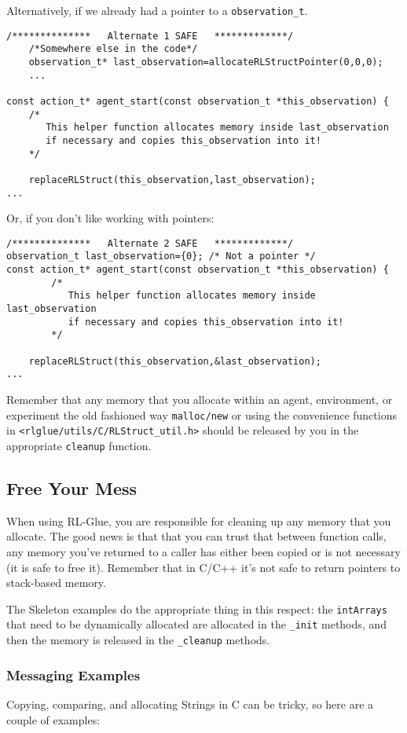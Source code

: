 \documentclass[11pt]{article}
\begin{document}
Alternatively, if we already had a pointer to a \texttt{observation\_t}.
\begin{verbatim}
/**************   Alternate 1 SAFE   *************/
    /*Somewhere else in the code*/
    observation_t* last_observation=allocateRLStructPointer(0,0,0);
    ...

const action_t* agent_start(const observation_t *this_observation) {
    /*
       This helper function allocates memory inside last_observation
       if necessary and copies this_observation into it!
    */

    replaceRLStruct(this_observation,last_observation);
...
\end{verbatim}

Or, if you don't like working with pointers:
\begin{verbatim}
/**************   Alternate 2 SAFE   *************/
observation_t last_observation={0}; /* Not a pointer */
const action_t* agent_start(const observation_t *this_observation) {
        /*
           This helper function allocates memory inside last_observation
           if necessary and copies this_observation into it!
        */
    
    replaceRLStruct(this_observation,&last_observation);
...
\end{verbatim}

Remember that any memory that you allocate within an agent, environment, or experiment the old fashioned way \texttt{malloc/new} or using the convenience functions in \texttt{<rlglue/utils/C/RLStruct\_util.h>} should be released
by you in the appropriate \texttt{cleanup} function.
\subsection{Free Your Mess}
When using RL-Glue, you are responsible for cleaning up any memory that you allocate. The good news is that that you can trust that between function calls, any memory you've returned to a caller has either been
copied or is not necessary (it is safe to free it).  Remember that in C/C++ it's not safe to return pointers to stack-based memory.

The Skeleton examples do the appropriate thing in this respect: the \texttt{intArrays} that need to be dynamically allocated are allocated in the \texttt{\_init} methods, and then the memory is released in the \texttt{\_cleanup} methods.

\subsubsection{Messaging Examples}
Copying, comparing, and allocating Strings in C can be tricky, so here are a couple of examples:
\end{document}
